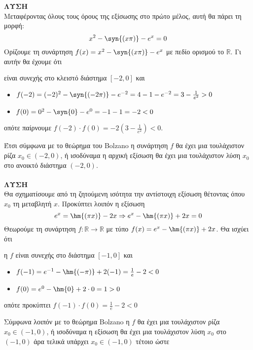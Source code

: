 \documentclass[twoside,nofonts,ektypwsh]{frontisthrio}
\begin{document}
\noindent
{}
\\\\
\textbf{ΛΥΣΗ}\\
Μεταφέροντας όλους τους όρους της εξίσωσης στο πρώτο μέλος, αυτή θα πάρει τη μορφή:
\[ x^2-\syn{(x\pi)}-e^x=0 \]
Ορίζουμε τη συνάρτηση $ f(x)=x^2-\syn{(x\pi)}-e^x $ με πεδίο ορισμού το $ \mathbb{R} $. Γι αυτήν θα έχουμε ότι
\begin{rlist}
\item είναι συνεχής στο κλειστό διάστημα $ [-2,0] $ και
\item \begin{itemize}
\item $ f(-2)=(-2)^2-\syn{(-2\pi)}-e^{-2}=4-1-e^{-2}=3-\frac{1}{e^2}>0 $
\item $ f(0)=0^2-\syn{0}-e^0=-1-1=-2<0 $
\end{itemize}
οπότε παίρνουμε $ f(-2)\cdot f(0)=-2\left(3-\frac{1}{e^2} \right)<0 $.
\end{rlist}
Έτσι σύμφωνα με το θεώρημα του Bolzano η συνάρτηση $ f $ θα έχει μια τουλάχιστον ρίζα $ x_0\in(-2,0) $, ή ισοδύναμα η αρχική εξίσωση θα έχει μια τουλάχιστον λύση $ x_0 $ στο ανοικτό διάστημα $ (-2,0) $.\\\\
\textbf{ΛΥΣΗ}\\
Θα σχηματίσουμε από τη ζητούμενη ισότητα την αντίστοιχη εξίσωση θέτοντας όπου $ x_0 $ τη μεταβλητή $ x $. Προκύπτει λοιπόν η εξίσωση
\[ e^{x}=\hm{(\pi x)}-2x\Rightarrow e^{x}-\hm{(\pi x)}+2x=0 \]
Θεωρούμε τη συνάρτηση $ f:\mathbb{R}\to\mathbb{R} $ με τύπο $ f(x)=e^{x}-\hm{(\pi x)}+2x $. Θα ισχύει ότι
\begin{rlist}
\item η $ f $ είναι συνεχής στο διάστημα $ [-1,0] $ και
\item \begin{itemize}
\item $ f(-1)=e^{-1}-\hm{(-\pi)}+2(-1)=\frac{1}{e}-2<0 $
\item $ f(0)=e^0-\hm{0}+2\cdot 0=1>0 $
\end{itemize}
οπότε προκύπτει $ f(-1)\cdot f(0)=\frac{1}{e}-2<0 $
\end{rlist}
Σύμφωνα λοιπόν με το θεώρημα Bolzano η $ f $ θα έχει μια τουλάχιστον ρίζα $ x_0\in(-1,0) $, ή ισοδύναμα η εξίσωση θα έχει μια τουλάχιστον λύση $ x_0 $ στο $ (-1,0) $ άρα τελικά υπάρχει $ x_0\in(-1,0) $ τέτοιο ώστε
\end{document}
